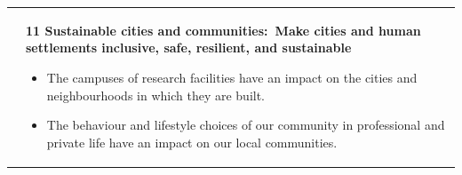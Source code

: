 \documentclass[../SustainableHEP.tex]{subfiles}
\begin{document}
\begin{longtable*}{l l}
\parbox[t]{\SDGleft\textwidth}{} & \parbox[t]{\SDGright\textwidth}{\textbf{11 Sustainable cities and communities:\ Make cities and human settlements inclusive, safe, resilient, and sustainable}
\begin{itemize}[leftmargin=20pt]
\item The campuses of research facilities have an impact on the cities and neighbourhoods in which they are built.
\item The behaviour and lifestyle choices of our community in professional and private life have an impact on our local communities.
\end{itemize}}\\


\end{longtable*}
\end{document}
